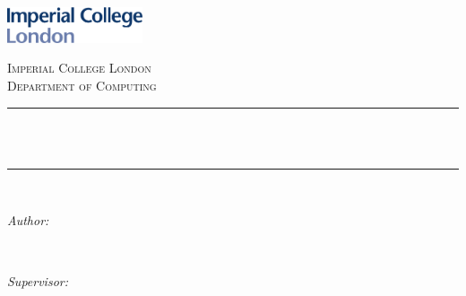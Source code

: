 \begin{titlepage}

\newcommand{\HRule}{\rule{\linewidth}{0.5mm}} %



\includegraphics[width = 4cm]{./figures/imperial} \\ [0.5cm] 

\center


\textsc{\Large Imperial College London}\\[0.5cm] 
\textsc{\large Department of Computing}\\[0.5cm] 


\HRule \\[0.4cm]
{ \huge \bfseries \reporttitle}\\ %
\HRule \\[1.5cm]
 

\begin{minipage}{0.4\textwidth}
\begin{flushleft} \large
\emph{Author:}\\
\reportauthor %
\end{flushleft}
\end{minipage}
~
\begin{minipage}{0.4\textwidth}
\begin{flushright} \large
\emph{Supervisor:} \\
\supervisor %
\end{flushright}
\end{minipage}\\[4cm]



\end{titlepage}
